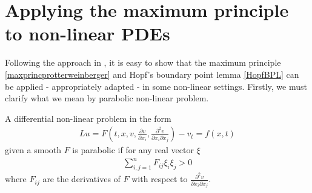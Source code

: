 \section{Applying the maximum principle to non-linear PDEs}
\label{non linear pde parabolic section}
Following the approach in \cite{protterweinberger}, it is easy to show that the maximum principle \ref{maxprincprotterweinberger} and Hopf's boundary point lemma \ref{HopfBPL} can be applied - appropriately adapted - in some non-linear settings.  Firstly, we must clarify what we mean by parabolic non-linear problem. 
\begin{defin}\label{nonlinearpde}
	A differential non-linear problem in the form 
	\begin{align}
		Lu= F\left(t, x, v, \frac{\partial v}{\partial x_i} , \frac{\partial^2 v}{\partial x_i \partial x_j}\right)-v_t = f(x, t)\label{nonlinearexample}
	\end{align} 
	given a smooth $F$ is parabolic if for any real vector $\xi$
	\begin{align*}
		\sum_{i, j=1}^n F_{ij}\xi_i\xi_j >0
	\end{align*} 
	where $F_{ij}$ are the derivatives of $F$ with respect to $\frac{\partial^2 v}{\partial x_i \partial x_j}$. 
\end{defin}

